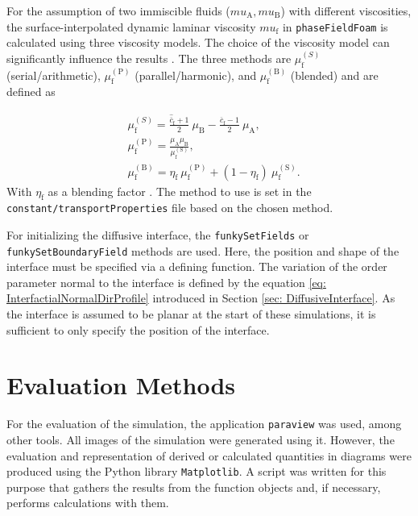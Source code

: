 For the assumption of two immiscible fluids ($mu_{\mathrm{A}}, mu_{\mathrm{B}}$) with different viscosities, the surface-interpolated dynamic laminar viscosity $mu_{\mathrm{f}}$ in \texttt{phaseFieldFoam} is calculated using three viscosity models. The choice of the viscosity model can significantly influence the results . The three methods are $\mu_{\mathrm{f}}^{(S)}$ (serial/arithmetic), $\mu_{\mathrm{f}}^{(\mathrm{P})}$ (parallel/harmonic), and $\mu_{\mathrm{f}}^{(\mathrm{B})}$ (blended) and are defined as

$$
\begin{aligned}
&\mu_{\mathrm{f}}^{(S)} =\frac{\hat{\overline{c}}_{\mathrm{f}}+1}{2}\:\mu_{\mathrm{B}}-\frac{\hat{\overline{c}}_{\mathrm{f}}-1}{2}\:\mu_{\mathrm{A}},  \\
&\mu_{\mathrm{f}}^{(\mathrm{P})} =\frac{\mu_{\mathrm{A}}\mu_{\mathrm{B}}}{\mu_{\mathrm{f}}^{(\mathrm{S})}},  \\
&\mu_{\mathrm{f}}^{(\mathrm{B})} =\eta_{\mathrm{f}}\:\mu_{\mathrm{f}}^{\mathrm{(P)}}+(1-\eta_{\mathrm{f}})\:\mu_{\mathrm{f}}^{\mathrm{(S)}}.
\end{aligned}
$$
With $\eta_{\mathrm{f}}$ as a blending factor \cite{holzinger2021DirectNumericalSimulation}. The method to use is set in the \texttt{constant/transportProperties} file based on the chosen method.

For initializing the diffusive interface, the \texttt{funkySetFields} or \texttt{funkySetBoundaryField} methods are used. Here, the position and shape of the interface must be specified via a defining function. The variation of the order parameter normal to the interface is defined by the equation \ref{eq: InterfactialNormalDirProfile} introduced in Section \ref{sec: DiffusiveInterface}. As the interface is assumed to be planar at the start of these simulations, it is sufficient to only specify the position of the interface.

\section{Evaluation Methods}
For the evaluation of the simulation, the application \texttt{paraview} was used, among other tools. All images of the simulation were generated using it. However, the evaluation and representation of derived or calculated quantities in diagrams were produced using the Python library \texttt{Matplotlib}. A script was written for this purpose that gathers the results from the function objects and, if necessary, performs calculations with them.

